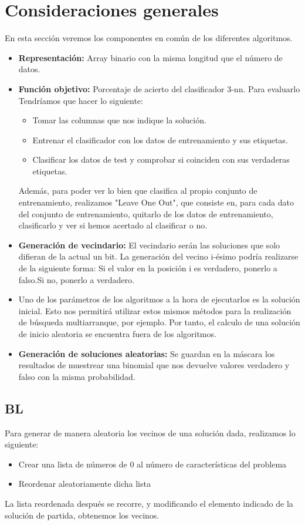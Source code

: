 \section{Consideraciones generales}
En esta sección veremos los componentes en común de los diferentes algoritmos.
\begin{itemize}
\item \textbf{Representación:} Array binario con la misma longitud que el número de datos.
\item \textbf{Función objetivo:} Porcentaje de acierto del clasificador 3-nn. Para evaluarlo Tendríamos que hacer lo siguiente:
\begin{itemize}
\item Tomar las columnas que nos indique la solución.
\item Entrenar el clasificador con los datos de entrenamiento y sus etiquetas.
\item Clasificar los datos de test y comprobar si coinciden con sus verdaderas etiquetas.
\end{itemize} 
Además, para poder ver lo bien que clasifica al propio conjunto de entrenamiento, realizamos "Leave One Out", que consiste en, para cada dato del conjunto de entrenamiento, quitarlo de los datos de entrenamiento, clasificarlo y ver si hemos acertado al clasificar o no.
\item \textbf{Generación de vecindario:} El vecindario serán las soluciones que solo difieran de la actual un bit. La generación del vecino i-ésimo podría realizarse de la siguiente forma: Si el valor en la posición i es verdadero, ponerlo a falso.Si no, ponerlo a verdadero. 
\item Uno de los parámetros de los algoritmos a la hora de ejecutarlos es la solución inicial. Esto nos permitirá utilizar estos mismos métodos para la realización de búsqueda multiarranque, por ejemplo. Por tanto, el calculo de una solución de inicio aleatoria se encuentra fuera de los algoritmos.
\item \textbf{Generación de soluciones aleatorias:} Se guardan en la máscara los resultados de muestrear una binomial que nos devuelve valores verdadero y falso con la misma probabilidad.
\end{itemize}
\subsection{BL}
Para generar de manera aleatoria los vecinos de una solución dada, realizamos lo siguiente:
\begin{itemize}
\item Crear una lista de números de 0 al número de características del problema
\item Reordenar aleatoriamente dicha lista
\end{itemize} 
La lista reordenada después se recorre, y modificando el elemento indicado de la solución de partida, obtenemos los vecinos.\\

